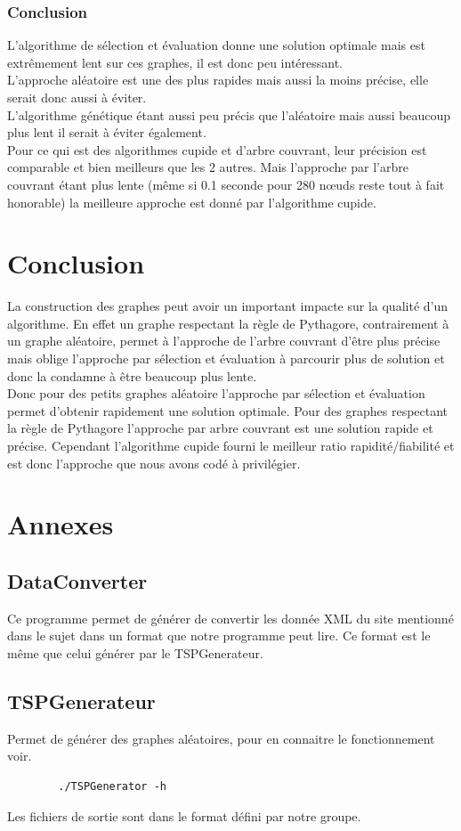 \documentclass[10pt,a4paper]{report}
\begin{document}
	\subsubsection{Conclusion}
	L'algorithme de sélection et évaluation donne une solution optimale mais est extrêmement lent sur ces graphes, il est donc peu intéressant.\\
	L'approche aléatoire est une des plus rapides mais aussi la moins précise, elle serait donc aussi à éviter.\\
	L'algorithme génétique étant aussi peu précis que l'aléatoire mais aussi beaucoup plus lent il serait à éviter également.\\
	Pour ce qui est des algorithmes cupide et d'arbre couvrant, leur précision est comparable et bien meilleurs que les 2 autres. Mais l'approche par l'arbre couvrant étant plus lente (même si 0.1 seconde pour 280 nœuds reste tout à fait honorable) la meilleure approche est donné par l'algorithme cupide.

\section{Conclusion}
La construction des graphes peut avoir un important impacte sur la qualité d'un algorithme. En effet un graphe respectant la règle de Pythagore, contrairement à un graphe aléatoire, permet à l'approche de l'arbre couvrant d'être plus précise mais oblige l'approche par sélection et évaluation à parcourir plus de solution et donc la condamne à être beaucoup plus lente.\\

Donc pour des petits graphes aléatoire l'approche par sélection et évaluation permet d'obtenir rapidement une solution optimale. Pour des graphes respectant la règle de Pythagore l'approche par arbre couvrant est une solution rapide et précise.
Cependant l'algorithme cupide fourni le meilleur ratio rapidité/fiabilité et est donc l'approche que nous avons codé à privilégier.
\section{Annexes}

	\subsection{DataConverter}
	\begin{flushleft}
	Ce programme permet de générer de convertir les donnée XML du site mentionné dans le sujet dans un format que notre programme peut lire. Ce format est le même que celui générer par le TSPGenerateur.
	\end{flushleft}
	
	\subsection{TSPGenerateur}
	Permet de générer des graphes aléatoires, pour en connaitre le fonctionnement voir.
	\begin{verbatim}
		./TSPGenerator -h
	\end{verbatim}
	Les fichiers de sortie sont dans le format défini par notre groupe.
\end{document}
